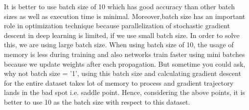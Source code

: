 \documentclass[a4paper,10pt]{article}
\begin{document}
It is better to use batch size of 10 which has good accuracy than other batch sizes as well as execution time is minimal.
Moreover,batch size has an important role in optimization technique because parallelization of stochastic gradient descent
in deep learning is limited, if we use small batch size. In order to solve this, we are using large batch size. When using
batch size of 10, the usage of memory is less during training and also networks train faster using mini batches because
we update weights after each propagation. But sometime you could ask, why not batch size = '1', using this batch size and calculating
gradient descent for the entire dataset takes lot of memory to process and gradient trajectory lands in the bad spot i.e. saddle point.
Hence, considering the above points, it is better to use 10 as the batch size with respect to this dataset.
\end{document}
